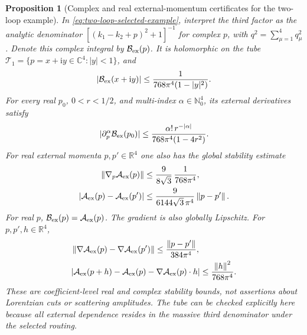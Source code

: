 \documentclass[final,5p,times,twocolumn,numbers,nopreprintline]{elsarticle}
\numberwithin{equation}{section}
\newtheorem{proposition}[theorem]{Proposition}
\theoremstyle{definition}
\theoremstyle{remark}
\newcommand{\ii}{\mathrm i}
\newcommand{\RR}{\mathbb R}
\newcommand{\CC}{\mathbb C}
\newcommand{\norm}[1]{\left\lVert #1\right\rVert}
\begin{document}
\begin{proposition}[Complex and real external-momentum certificates for the two-loop example]
\label{prop:two-loop-complex-certificate}
In \eqref{eq:two-loop-selected-example}, interpret the third
factor as the analytic denominator
$[(k_1-k_2+p)^2+1]^{-1}$ for complex $p$, with
$q^2=\sum_{\mu=1}^4q_\mu^2$. Denote this complex integral by
$\mathcal B_{\rm ex}(p)$. It is holomorphic on the tube
$\mathcal T_1=\{p=x+\ii y\in\CC^4:|y|<1\}$, and
\begin{equation}
 |\mathcal B_{\rm ex}(x+\ii y)|
 \leq\frac{1}{768\pi^4(1-|y|^2)}.
 \label{eq:two-loop-complex-bound}
\end{equation}
For every real $p_0$, $0<r<1/2$, and multi-index
$\alpha\in\mathbb N_0^4$, its external derivatives satisfy
\begin{equation}
 |\partial_p^\alpha\mathcal B_{\rm ex}(p_0)|
 \leq\frac{\alpha!\,r^{-|\alpha|}}
 {768\pi^4(1-4r^2)}.
 \label{eq:two-loop-complex-derivative}
\end{equation}
For real external momenta $p,p'\in\RR^4$ one also has the
global stability estimate
\begin{equation}
 \begin{aligned}
 \norm{\nabla_p\mathcal A_{\rm ex}(p)}
 &\leq\frac{9}{8\sqrt3}\,\frac1{768\pi^4},\\
 |\mathcal A_{\rm ex}(p)-\mathcal A_{\rm ex}(p')|
 &\leq\frac{9}{6144\sqrt3\,\pi^4}\norm{p-p'}.
 \end{aligned}
 \label{eq:two-loop-real-Lipschitz}
\end{equation}
For real $p$, $\mathcal B_{\rm ex}(p)=\mathcal A_{\rm ex}(p)$.
The gradient is also globally Lipschitz. For $p,p',h\in\RR^4$,
\begin{equation}
 \begin{aligned}
 &\norm{\nabla\mathcal A_{\rm ex}(p)
             -\nabla\mathcal A_{\rm ex}(p')}\leq
             \frac{\norm{p-p'}}{384\pi^4},\\
 &|\mathcal A_{\rm ex}(p+h)-\mathcal A_{\rm ex}(p)
        -\nabla\mathcal A_{\rm ex}(p)\cdot h|\leq
             \frac{\norm{h}^2}{768\pi^4}.
 \end{aligned}
 \label{eq:two-loop-real-second-order}
\end{equation}
These are coefficient-level real and complex stability bounds, not
assertions about Lorentzian cuts or scattering amplitudes. The tube
can be checked explicitly here because all external dependence
resides in the massive third denominator under the selected routing.
\end{proposition}
\end{document}

